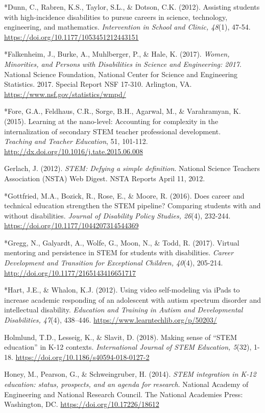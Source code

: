 \documentclass[11pt]{sig-alternate}
\begin{document}
\begin{large}
*Dunn, C., Rabren, K.S., Taylor, S.L., \& Dotson, C.K. (2012). Assisting students with high-incidence disabilities to pursue careers in science, technology, engineering, and mathematics. \textit{Intervention in School and Clinic, 48}(1), 47-54. \url{https://doi.org/10.1177/1053451212443151}

*Falkenheim, J., Burke, A., Muhlberger, P., \& Hale, K. (2017). \textit{Women, Minorities, and Persons with Disabilities in Science and Engineering: 2017}. National Science Foundation, National Center for Science and Engineering Statistics. 2017. Special Report NSF 17-310. Arlington, VA. \url{https://www.nsf.gov/statistics/wmpd/}

*Fore, G.A., Feldhaus, C.R., Sorge, B.H., Agarwal, M., \& Varahramyan, K. (2015). Learning at the nano-level: Accounting for complexity in the internalization of secondary STEM teacher professional development. \\\textit{Teaching and Teacher Education}, 51, 101-112. \url{http://dx.doi.org/10.1016/j.tate.2015.06.008}

Gerlach, J. (2012). \textit{STEM: Defying a simple definition}. National Science Teachers Association (NSTA) Web Digest. NSTA Reports April 11, 2012.

*Gottfried, M.A., Bozick, R., Rose, E., \& Moore, R. (2016). Does career and technical education strengthen the STEM pipeline? Comparing students with and without disabilities. \textit{Journal of Disability Policy Studies, 26}(4), 232-244. \url{https://doi.org/10.1177/1044207314544369}

*Gregg, N., Galyardt, A., Wolfe, G., Moon, N., \& Todd, R. (2017). Virtual mentoring and 
persistence in STEM for students with disabilities.\textit{ Career Development and Transition for Exceptional Children, 40}(4), 205-214. \url{http://doi.org/10.1177/2165143416651717}

*Hart, J.E., \& Whalon, K.J. (2012). Using video self-modeling via iPads to increase academic 
responding of an adolescent with autism spectrum disorder and intellectual disability. 
\textit{Education and Training in Autism and Developmental Disabilities, 47}(4), 438–446. \url{https://www.learntechlib.org/p/50203/}

Holmlund, T.D., Lesseig, K., \& Slavit, D. (2018). Making sense of “STEM education” in K-12 contexts. \textit{International Journal of STEM Education, 5}(32), 1-18. \url{https://doi.org/10.1186/s40594-018-0127-2}

Honey, M., Pearson, G., \& Schweingruber, H. (2014). \textit{STEM integration in K-12 education: status, prospects, and an agenda for research}. National Academy of Engineering and National Research Council. The National Academies Press: Washington, DC. \url{https://doi.org/10.17226/18612}


\end{large}
\end{document}
